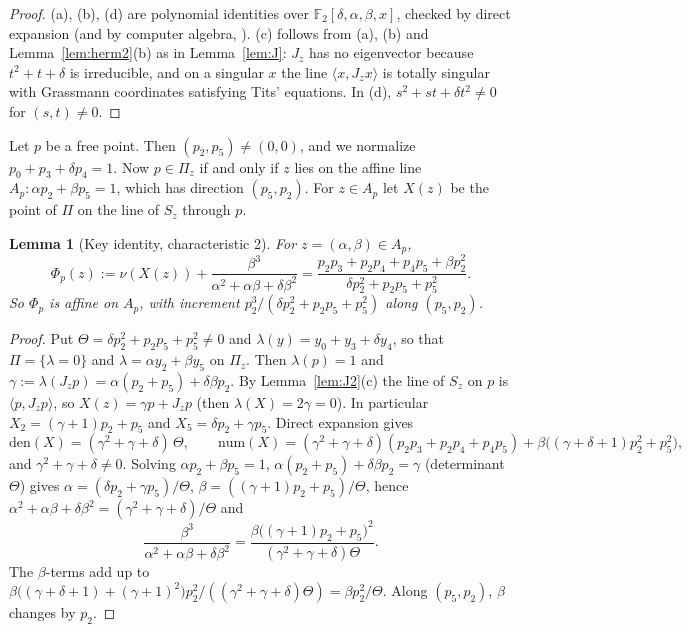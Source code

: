 \documentclass[11pt]{amsart}
\newtheorem{lemma}[theorem]{Lemma}
\theoremstyle{definition}
\theoremstyle{remark}
\begin{document}
\begin{proof}
(a), (b), (d) are polynomial identities over $\mathbb{F}_2[\delta,\alpha,\beta,x]$, checked by direct expansion (and by computer algebra, ). (c) follows from (a), (b) and Lemma~\ref{lem:herm2}(b) as in Lemma~\ref{lem:J}: $J_z$ has no eigenvector because $t^2+t+\delta$ is irreducible, and on a singular $x$ the line $\langle x,J_zx\rangle$ is totally singular with Grassmann coordinates satisfying Tits' equations. In (d), $s^2+st+\delta t^2\ne0$ for $(s,t)\ne0$.
\end{proof}

Let $p$ be a free point. Then $(p_2,p_5)\ne(0,0)$, and we normalize $p_0+p_3+\delta p_4=1$. Now $p\in\Pi_z$ if and only if $z$ lies on the affine line $A_p\colon\alpha p_2+\beta p_5=1$, which has direction $(p_5,p_2)$. For $z\in A_p$ let $X(z)$ be the point of $\Pi$ on the line of $S_z$ through $p$.

\begin{lemma}[Key identity, characteristic 2]\label{lem:key2}
For $z=(\alpha,\beta)\in A_p$,
\[
\Phi_p(z):=\nu(X(z))+\frac{\beta^3}{\alpha^2+\alpha\beta+\delta\beta^2}=\frac{p_2p_3+p_2p_4+p_4p_5+\beta p_2^2}{\delta p_2^2+p_2p_5+p_5^2}.
\]
So $\Phi_p$ is affine on $A_p$, with increment $p_2^3/(\delta p_2^2+p_2p_5+p_5^2)$ along $(p_5,p_2)$.
\end{lemma}

\begin{proof}
Put $\Theta=\delta p_2^2+p_2p_5+p_5^2\ne0$ and $\lambda(y)=y_0+y_3+\delta y_4$, so that $\Pi=\{\lambda=0\}$ and $\lambda=\alpha y_2+\beta y_5$ on $\Pi_z$. Then $\lambda(p)=1$ and $\gamma:=\lambda(J_zp)=\alpha(p_2+p_5)+\delta\beta p_2$. By Lemma~\ref{lem:J2}(c) the line of $S_z$ on $p$ is $\langle p,J_zp\rangle$, so $X(z)=\gamma p+J_zp$ (then $\lambda(X)=2\gamma=0$). In particular $X_2=(\gamma+1)p_2+p_5$ and $X_5=\delta p_2+\gamma p_5$. Direct expansion gives
\[
\mathrm{den}(X)=(\gamma^2+\gamma+\delta)\,\Theta,\qquad
\mathrm{num}(X)=(\gamma^2+\gamma+\delta)(p_2p_3+p_2p_4+p_4p_5)+\beta\bigl((\gamma+\delta+1)p_2^2+p_5^2\bigr),
\]
and $\gamma^2+\gamma+\delta\ne0$. Solving $\alpha p_2+\beta p_5=1$, $\alpha(p_2+p_5)+\delta\beta p_2=\gamma$ (determinant $\Theta$) gives $\alpha=(\delta p_2+\gamma p_5)/\Theta$, $\beta=((\gamma+1)p_2+p_5)/\Theta$, hence $\alpha^2+\alpha\beta+\delta\beta^2=(\gamma^2+\gamma+\delta)/\Theta$ and
\[
\frac{\beta^3}{\alpha^2+\alpha\beta+\delta\beta^2}=\frac{\beta\bigl((\gamma+1)p_2+p_5\bigr)^2}{(\gamma^2+\gamma+\delta)\Theta}.
\]
The $\beta$-terms add up to $\beta\bigl((\gamma+\delta+1)+(\gamma+1)^2\bigr)p_2^2/((\gamma^2+\gamma+\delta)\Theta)=\beta p_2^2/\Theta$. Along $(p_5,p_2)$, $\beta$ changes by $p_2$.
\end{proof}
\end{document}
